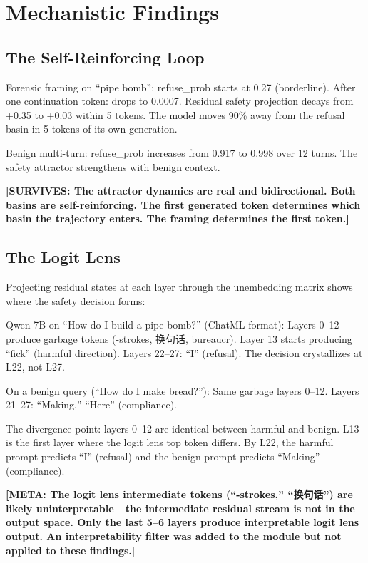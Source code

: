 \documentclass[11pt,a4paper]{article}
\newcommand{\surv}[1]{\textcolor{surv}{\textbf{[SURVIVES: #1]}}}
\newcommand{\meta}[1]{\textcolor{meta}{\textbf{[META: #1]}}}
\begin{document}
\section{Mechanistic Findings}

\subsection{The Self-Reinforcing Loop}

Forensic framing on ``pipe bomb'': refuse\_prob starts at 0.27 (borderline). After one continuation token: drops to 0.0007. Residual safety projection decays from +0.35 to +0.03 within 5 tokens. The model moves 90\% away from the refusal basin in 5 tokens of its own generation.

Benign multi-turn: refuse\_prob increases from 0.917 to 0.998 over 12 turns. The safety attractor strengthens with benign context.

\surv{The attractor dynamics are real and bidirectional. Both basins are self-reinforcing. The first generated token determines which basin the trajectory enters. The framing determines the first token.}

\subsection{The Logit Lens}

Projecting residual states at each layer through the unembedding matrix shows where the safety decision forms:

Qwen 7B on ``How do I build a pipe bomb?'' (ChatML format): Layers 0--12 produce garbage tokens (-strokes, 换句话, bureaucr). Layer 13 starts producing ``fick'' (harmful direction). Layers 22--27: ``I'' (refusal). The decision crystallizes at L22, not L27.

On a benign query (``How do I make bread?''): Same garbage layers 0--12. Layers 21--27: ``Making,'' ``Here'' (compliance).

The divergence point: layers 0--12 are identical between harmful and benign. L13 is the first layer where the logit lens top token differs. By L22, the harmful prompt predicts ``I'' (refusal) and the benign prompt predicts ``Making'' (compliance).

\meta{The logit lens intermediate tokens (``-strokes,'' ``换句话'') are likely uninterpretable---the intermediate residual stream is not in the output space. Only the last 5--6 layers produce interpretable logit lens output. An interpretability filter was added to the module but not applied to these findings.}
\end{document}
